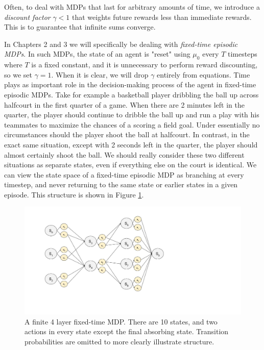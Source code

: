 Often, to deal with MDPs that last for arbitrary amounts of time, we introduce a {\em discount factor} $\gamma < 1$ that weights future rewards less than immediate rewards. This is to guarantee that infinite sums converge. 

In Chapters 2 and 3 we will specifically be dealing with {\em fixed-time episodic MDPs}. In such MDPs, the state of an agent is "reset" using $\mu_0$ every $T$ timesteps where $T$ is a fixed constant, and it is unnecessary to perform reward discounting, so we set $\gamma = 1$. When it is clear, we will drop $\gamma$ entirely from equations. Time plays as important role in the decision-making process of the agent in fixed-time episodic MDPs. Take for example a basketball player dribbling the ball up across halfcourt in the first quarter of a game. When there are 2 minutes left in the quarter, the player should continue to dribble the ball up and run a play with his teammates to maximize the chances of a scoring a field goal. Under essentially no circumstances should the player shoot the ball at halfcourt. In contrast, in the exact same situation, except with 2 seconds left in the quarter, the player should almost certainly shoot the ball. We should really consider these two different situations as separate states, even if everything else on the court is identical. We can view the state space of a fixed-time episodic MDP as branching at every timestep, and never returning to the same state or earlier states in a given episode. This structure is shown in Figure \ref{fig:finitemdp}.

\begin{figure}
    \centering
    \includegraphics[scale=0.4]{images/fixed_time_finite_mdp.jpg}
    \caption{A finite 4 layer fixed-time MDP. There are 10 states, and two actions in every state except the final absorbing state. Transition probabilities are omitted to more clearly illustrate structure.}
    \label{fig:finitemdp}
\end{figure}

